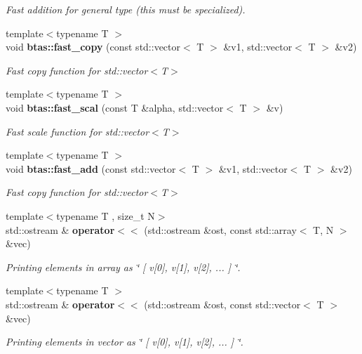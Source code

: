 \begin{DoxyCompactItemize}
\begin{DoxyCompactList}\small\item\em Fast addition for general type (this must be specialized). \end{DoxyCompactList}\item 
{\footnotesize template$<$typename T $>$ }\\void {\bf btas\-::fast\-\_\-copy} (const std\-::vector$<$ T $>$ \&v1, std\-::vector$<$ T $>$ \&v2)
\begin{DoxyCompactList}\small\item\em Fast copy function for std\-::vector$<$\-T$>$ \end{DoxyCompactList}\item 
{\footnotesize template$<$typename T $>$ }\\void {\bf btas\-::fast\-\_\-scal} (const T \&alpha, std\-::vector$<$ T $>$ \&v)
\begin{DoxyCompactList}\small\item\em Fast scale function for std\-::vector$<$\-T$>$ \end{DoxyCompactList}\item 
{\footnotesize template$<$typename T $>$ }\\void {\bf btas\-::fast\-\_\-add} (const std\-::vector$<$ T $>$ \&v1, std\-::vector$<$ T $>$ \&v2)
\begin{DoxyCompactList}\small\item\em Fast copy function for std\-::vector$<$\-T$>$ \end{DoxyCompactList}\item 
{\footnotesize template$<$typename T , size\-\_\-t N$>$ }\\std\-::ostream \& {\bf operator$<$$<$} (std\-::ostream \&ost, const std\-::array$<$ T, N $>$ \&vec)
\begin{DoxyCompactList}\small\item\em Printing elements in array as \char`\"{} [ v[0], v[1], v[2], ... ] \char`\"{}. \end{DoxyCompactList}\item 
{\footnotesize template$<$typename T $>$ }\\std\-::ostream \& {\bf operator$<$$<$} (std\-::ostream \&ost, const std\-::vector$<$ T $>$ \&vec)
\begin{DoxyCompactList}\small\item\em Printing elements in vector as \char`\"{} [ v[0], v[1], v[2], ... ] \char`\"{}. \end{DoxyCompactList}\end{DoxyCompactItemize}


